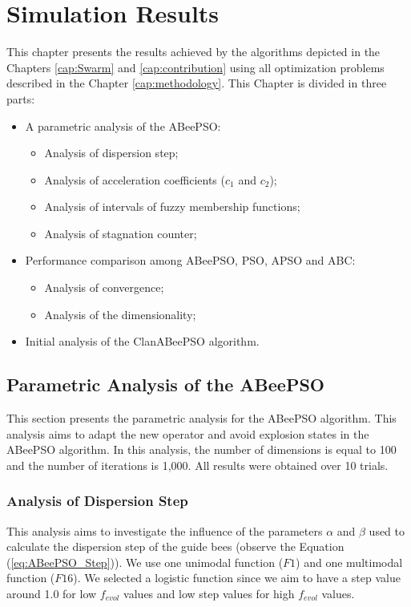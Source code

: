 \chapter{Simulation Results}\label{cap:results}
This chapter presents the results achieved by the algorithms depicted in the Chapters \ref{cap:Swarm} and \ref{cap:contribution} using all optimization problems described in the Chapter \ref{cap:methodology}. This Chapter is divided in three parts:
\begin{itemize}
  \item A parametric analysis of the ABeePSO:
  \begin{itemize}
    \item Analysis of dispersion step;
    \item Analysis of acceleration coefficients ($c_1$ and $c_2$);
    \item Analysis of intervals of fuzzy membership functions;
    \item Analysis of stagnation counter;
  \end{itemize}
  \item Performance comparison among ABeePSO, PSO, APSO and ABC:
  \begin{itemize}
    \item Analysis of convergence;
    \item Analysis of the dimensionality;
  \end{itemize}
  \item Initial analysis of the ClanABeePSO algorithm.
\end{itemize}

\section{Parametric Analysis of the ABeePSO}
This section presents the parametric analysis for the ABeePSO algorithm. This analysis aims to adapt the new operator and avoid explosion states in the ABeePSO algorithm. In this analysis, the number of dimensions is equal to 100 and the number of iterations is 1,000. All results were obtained over 10 trials.

\subsection{Analysis of Dispersion Step}
This analysis aims to investigate the influence of the parameters $\alpha$ and $\beta$ used to calculate the dispersion step of the guide bees (observe the Equation (\ref{eq:ABeePSO_Step})). We use one unimodal function ($F1$) and one multimodal function ($F16$). We selected a logistic function since we aim to have a step value around 1.0 for low $f_{evol}$ values and low step values for high $f_{evol}$ values.

